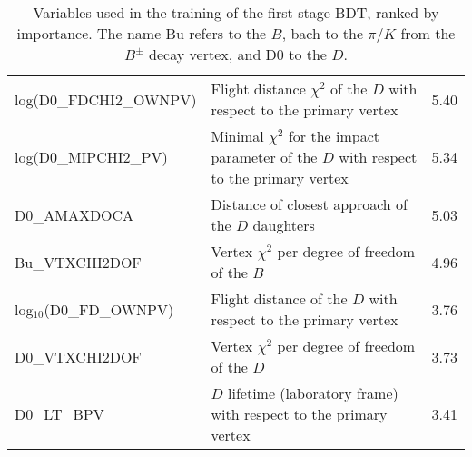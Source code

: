 \documentclass[oneside,12pt]{article}
\begin{document}
{\begin{landscape}
\begin{table}[]
{\begin{tabular}{lll}
          log(D0\_FDCHI2\_OWNPV)      & Flight distance $\chi^2$ of the $D$ with respect to
          the primary vertex          & 5.40
          \\
          log(D0\_MIPCHI2\_PV)        & Minimal $\chi^2$ for the impact parameter of the $D$
          with respect to the primary vertex
          & 5.34
          \\
          D0\_AMAXDOCA                & Distance of closest approach of the $D$ daughters
          & 5.03
          \\
          Bu\_VTXCHI2DOF              & Vertex $\chi^2$ per degree of freedom of the $B$
          & 4.96
          \\
          log$_{10}$(D0\_FD\_OWNPV)   & Flight distance of the $D$ with respect to the
          primary vertex              & 3.76
          \\
          D0\_VTXCHI2DOF              & Vertex $\chi^2$ per degree of freedom of the $D$
          & 3.73
          \\
          D0\_LT\_BPV                 & $D$ lifetime (laboratory frame) with respect to 
          the primary vertex          & 3.41
          \\ \hline
        \end{tabular}
      } \caption{{Variables used in the training of the first stage BDT, ranked
          by importance. The name Bu refers to the $B$, bach to the $\pi/K$ from the
      $B^{\pm}$ decay vertex, and D0 to the $D$.}}
      \label{table:bdt1TrainingVar}
    \end{table}


\end{landscape}}
\end{document}
